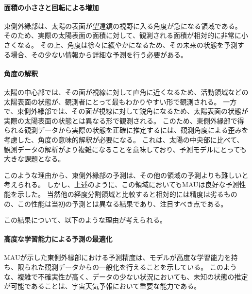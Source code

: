       \paragraph{面積の小ささと回転による増加}
        東側外縁部は、太陽の表面が望遠鏡の視野に入る角度が急になる領域である。
        そのため、実際の太陽表面の面積に対して、観測される面積が相対的に非常に小さくなる。
        その上、角度は徐々に緩やかになるため、その未来の状態を予測する場合、その少ない情報から詳細な予測を行う必要がある。
      \paragraph{角度の解釈}
        太陽の中心部では、その面が視線に対して直角に近くなるため、活動領域などの太陽表面の状態が、観測者にとって最もわかりやすい形で観測される。
        一方で、東側外縁部では、その面が視線に対して鋭角になるため、太陽表面の状態が実際の太陽表面の状態とは異なる形で観測される。
        このため、東側外縁部で得られる観測データから実際の状態を正確に推定するには、観測角度による歪みを考慮した、角度の意味的解釈が必要になる。
        これは、太陽の中央部に比べて、観測データの解析がより複雑になることを意味しており、予測モデルにとっても大きな課題となる。
      
      このような理由から、東側外縁部の予測は、その他の領域の予測よりも難しいと考えられる。
      しかし、上述のように、この領域においてもMAUは良好な予測性能を示した。
      当然他の経度分割領域と比較すると相対的には精度は劣るものの、この性能は当初の予測とは異なる結果であり、注目すべき点である。
      
      この結果について、以下のような理由が考えられる。
      \paragraph{高度な学習能力による予測の最適化}
        MAUが示した東側外縁部における予測精度は、モデルが高度な学習能力を持ち、限られた観測データからの一般化を行えることを示している。
        このような、複雑で不確実性が高く、データの少ない状況においても、未知の状態の推定が可能であることは、宇宙天気予報において重要な能力である。

